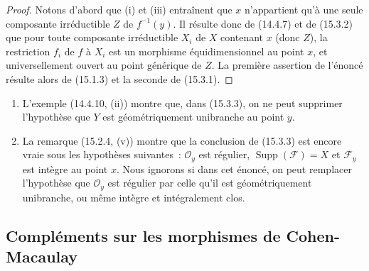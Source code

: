 \begin{proof}
Notons d'abord que (i) et (iii) entraînent que $x$ n'appartient qu'à une seule
composante irréductible $Z$ de $f^{-1}(y)$. Il résulte donc de (14.4.7) et de
(15.3.2) que pour toute composante irréductible $X_i$ de $X$ contenant $x$
(donc $Z$), la restriction $f_i$ de $f$ à $X_i$ est un morphisme
équidimensionnel au point $x$, et universellement ouvert au point générique de
$Z$. La première assertion de l'énoncé résulte alors de (15.1.3) et la seconde
de (15.3.1).
\end{proof}

\begin{remarks}[15.3.4]
\label{IV.15.3.4-fr}
\begin{enumerate}[label=(\roman*)]
  \item L'exemple (14.4.10, (ii)) montre que, dans (15.3.3), on ne peut
  supprimer l'hypothèse que $Y$ est géométriquement unibranche au point $y$.
  \item La remarque (15.2.4, (v)) montre que la conclusion de (15.3.3) est
  encore vraie sous les hypothèses suivantes~: $\mathcal O_y$ est régulier,
  $\operatorname{Supp}(\mathcal F)=X$ et $\mathcal F_y$ est intègre au point
  $x$. Nous ignorons si dans cet énoncé, on peut remplacer l'hypothèse que
  $\mathcal O_y$ est régulier par celle qu'il est géométriquement unibranche, ou
  même intègre et intégralement clos.
\end{enumerate}
\end{remarks}

\subsection{Compléments sur les morphismes de Cohen-Macaulay}
\label{subsection:IV.15.4-fr}

